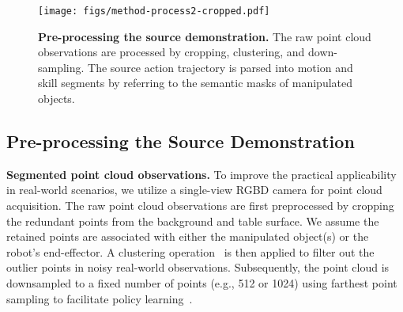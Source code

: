 
 \begin{figure}
    \centering
    \texttt{[image: figs/method-process2-cropped.pdf]}
    \caption{\textbf{Pre-processing the source demonstration.} The raw point cloud observations are processed by cropping, clustering, and down-sampling. The source action trajectory is parsed into \textcolor{myorange}{motion} and \textcolor{myblue}{skill} segments by referring to the semantic masks of manipulated objects.}
    \label{fig:method_parse}
    \vspace{-0.2cm}
\end{figure}




\subsection{Pre-processing the Source Demonstration}
\label{sec:method-preprocess}

\noindent \textbf{Segmented point cloud observations.}  
To improve the practical applicability in real-world scenarios, we utilize a single-view RGBD camera for point cloud acquisition.
The raw point cloud observations are first preprocessed by cropping the redundant points from the background and table surface. We assume the retained points are associated with either the manipulated object(s) or the robot’s end-effector. A clustering operation~\cite{ester1996density} is then applied to filter out the outlier points in noisy real-world observations. Subsequently, the point cloud is downsampled to a fixed number of points (e.g., 512 or 1024) using farthest point sampling to facilitate policy learning~\cite{qi2017pointnet}. 

